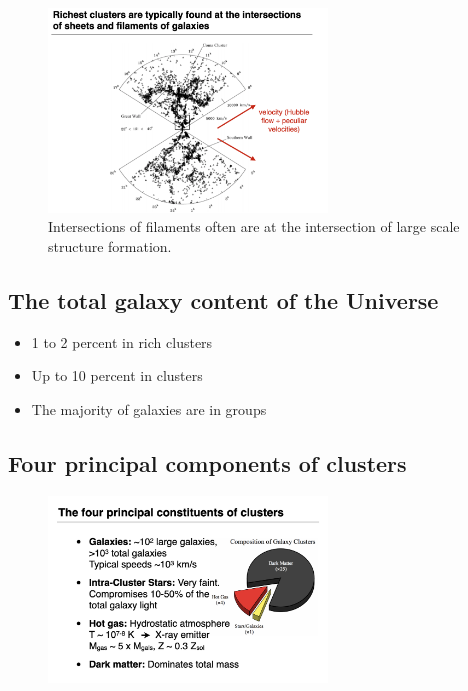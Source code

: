 \documentclass{article}
\begin{document}
\begin{figure}
    \centering
    \includegraphics[width=0.66\textwidth]{figs/Screen Shot 2021-10-29 at 10.20.05 AM.png}
    \caption{Intersections of filaments often are at the intersection of large scale structure formation. }
    \label{fig:asdasdasdasd}
\end{figure}

\subsection{The total galaxy content of the Universe}

\begin{itemize}
    \item 1 to 2 percent in rich clusters
    \item Up to 10 percent in clusters
    \item The majority of galaxies are in groups
\end{itemize}

\subsection{Four principal components of clusters}

\begin{figure}
    \centering
    \includegraphics[width=0.66\textwidth]{figs/Screen Shot 2021-10-29 at 10.21.55 AM.png}
    \caption{}
    \label{fig:asdasdasdsaddaaaas}
\end{figure}
\end{document}
